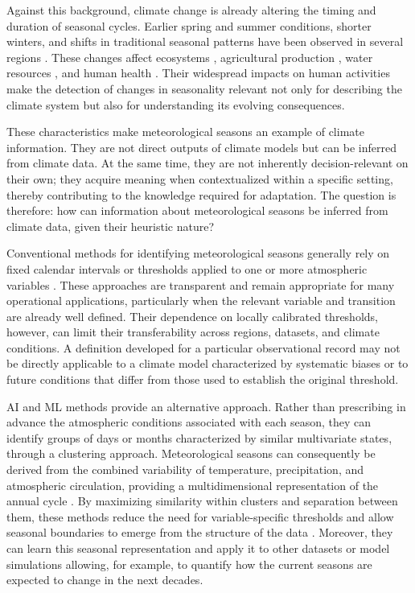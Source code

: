 Against this background, climate change is already altering the timing and duration of seasonal cycles. Earlier spring and summer conditions, shorter winters, and shifts in traditional seasonal patterns have been observed in several regions \citep{woolway_pace_2023,sparks_observed_2002,morisette_tracking_2009,cayan_changes_2001}. These changes affect ecosystems \citep{ren_earlier_2024,uphus_earlier_2023}, agricultural production \citep{minoli_global_2022,tran_climate_2025}, water resources \citep{zhao_counteracting_2025}, and human health \citep{ruan_climate_2025,luthi_rapid_2023}. Their widespread impacts on human activities make the detection of changes in seasonality relevant not only for describing the climate system but also for understanding its evolving consequences.

These characteristics make meteorological seasons an example of climate information. They are not direct outputs of climate models but can be inferred from climate data. At the same time, they are not inherently decision-relevant on their own; they acquire meaning when contextualized within a specific setting, thereby contributing to the knowledge required for adaptation. The question is therefore: how can information about meteorological seasons be inferred from climate data, given their heuristic nature?

Conventional methods for identifying meteorological seasons generally rely on fixed calendar intervals or thresholds applied to one or more atmospheric variables \citep{kutta_reconsidering_2016,wang_changing_2021,hekmatzadeh_new_2020,de_la_franca_changes_2013}. These approaches are transparent and remain appropriate for many operational applications, particularly when the relevant variable and transition are already well defined. Their dependence on locally calibrated thresholds, however, can limit their transferability across regions, datasets, and climate conditions. A definition developed for a particular observational record may not be directly applicable to a climate model characterized by systematic biases or to future conditions that differ from those used to establish the original threshold.

AI and ML methods provide an alternative approach. Rather than prescribing in advance the atmospheric conditions associated with each season, they can identify groups of days or months characterized by similar multivariate states, through a clustering approach. Meteorological seasons can consequently be derived from the combined variability of temperature, precipitation, and atmospheric circulation, providing a multidimensional representation of the annual cycle \citep{chattopadhyay_predicting_2020,chidean_spatio-temporal_2020,lee_new_2023}. By maximizing similarity within clusters and separation between them, these methods reduce the need for variable-specific thresholds and allow seasonal boundaries to emerge from the structure of the data \citep{xu_clustering_2008}. Moreover, they can learn this seasonal representation and apply it to other datasets or model simulations allowing, for example, to quantify how the current seasons are expected to change in the next decades.

